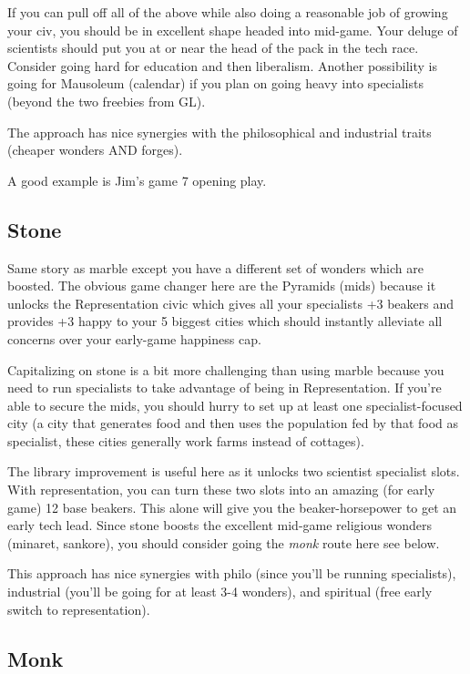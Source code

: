 \documentclass[10pt]{article}
\begin{document}
If you can pull off all of the above while also doing a reasonable job
of growing your civ, you should be in excellent shape headed into
mid-game. Your deluge of scientists should put you at or near the head
of the pack in the tech race. Consider going hard for education and
then liberalism. Another possibility is going for Mausoleum (calendar)
if you plan on going heavy into specialists (beyond the two freebies
from GL).

The approach has nice synergies with the philosophical and industrial traits (cheaper wonders AND forges).

A good example is Jim's game 7 opening play.

\subsection*{Stone}

Same story as marble except you have a different set of wonders which
are boosted. The obvious game changer here are the Pyramids (mids)
because it unlocks the Representation civic which gives all your
specialists +3 beakers and provides +3 happy to your 5 biggest cities
which should instantly alleviate all concerns over your early-game
happiness cap.

Capitalizing on stone is a bit more challenging than using marble
because you need to run specialists to take advantage of being in
Representation. If you're able to secure the mids, you should hurry to
set up at least one specialist-focused city (a city that generates
food and then uses the population fed by that food as specialist,
these cities generally work farms instead of cottages).

The library improvement is useful here as it unlocks two scientist
specialist slots. With representation, you can turn these two slots
into an amazing (for early game) 12 base beakers. This alone will give
you the beaker-horsepower to get an early tech lead. Since stone
boosts the excellent mid-game religious wonders (minaret, sankore),
you should consider going the \emph{monk} route here see below.

This approach has nice synergies with philo (since you'll be running
specialists), industrial (you'll be going for at least 3-4 wonders),
and spiritual (free early switch to representation).

\subsection*{Monk}
\end{document}

